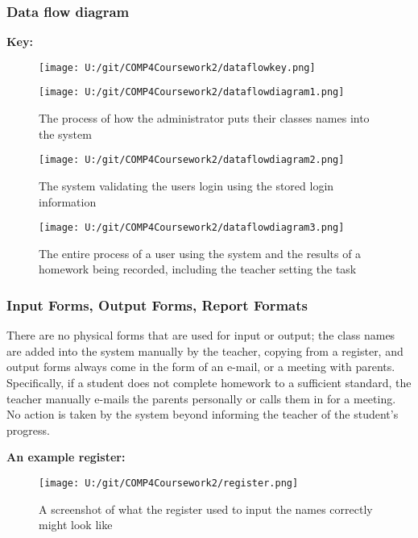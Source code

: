 \subsubsection{Data flow diagram}

\textbf{Key: }

\begin{figure}[H]
    \texttt{[image: U:/git/COMP4Coursework2/dataflowkey.png]}
\end{figure}


\begin{figure}[H]
    \texttt{[image: U:/git/COMP4Coursework2/dataflowdiagram1.png]}
    \caption{The process of how the administrator puts their classes names into the system} \label{fig:print_function_result}
\end{figure}

\begin{figure}[H]
    \texttt{[image: U:/git/COMP4Coursework2/dataflowdiagram2.png]}
    \caption{The system validating the users login using the stored login information} \label{fig:print_function_result}
\end{figure}

\begin{figure}[H]
    \texttt{[image: U:/git/COMP4Coursework2/dataflowdiagram3.png]}
    \caption{The entire process of a user using the system and the results of a homework being recorded, including the teacher setting the task} \label{fig:print_function_result}
\end{figure}

\subsubsection{Input Forms, Output Forms, Report Formats}

There are no physical forms that are used for input or output; the class names are added into the system manually by the teacher, copying from a register, and output forms always come in the form of an e-mail, or a meeting with parents. Specifically, if a student does not complete homework to a sufficient standard, the teacher manually e-mails the parents personally or calls them in for a meeting. No action is taken by the system beyond informing the teacher of the student's progress.

\textbf{An example register:}

\begin{figure}[H]
    \texttt{[image: U:/git/COMP4Coursework2/register.png]}
    \caption{A screenshot of what the register used to input the names correctly might look like} \label{fig:print_function_result}
\end{figure}

